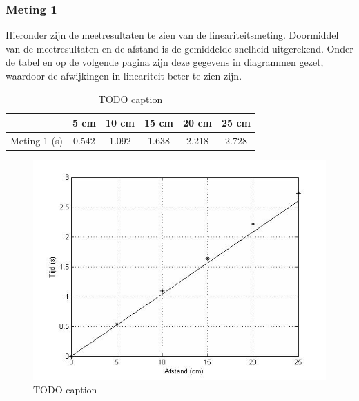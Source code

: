 \documentclass{report}
\begin{document}
\subsubsection*{Meting 1}
Hieronder zijn de meetresultaten te zien van de lineariteitsmeting. Doormiddel van de meetresultaten en de afstand is de gemiddelde snelheid uitgerekend. Onder de tabel en op de volgende pagina zijn deze gegevens in diagrammen gezet, waardoor de afwijkingen in lineariteit beter te zien zijn. 
\begin{table}
\begin{center}
\begin{tabular}{| l| c| c| c| c| c|}
\hline
   & 5 cm & 10 cm & 15 cm & 20 cm & 25 cm\\
\hline
   Meting 1 (s) & 0.542 & 1.092 & 1.638 & 2.218 & 2.728 \\
\hline
 \end{tabular}
\caption{TODO caption}
\end{center}
\end{table}

\begin{figure}
\begin{center}
\includegraphics[width=150mm] {Lineariteitsmeting1.jpg}
\caption{TODO caption}
\end{center}
\end{figure}
\end{document}
